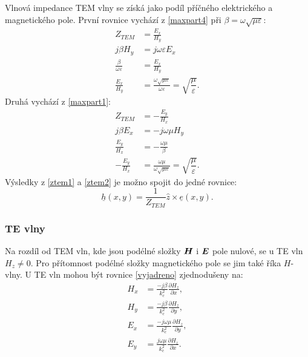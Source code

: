 \documentclass[12pt,a4paper,oneside]{article}
\numberwithin{equation}{section} %
\numberwithin{figure}{section} %
\numberwithin{table}{section} %
\renewcommand{\vec}[1]{\mbox{\boldmath$#1$}} %
\newcommand{\faz}[1]{{\underline{#1}}} %
\begin{document}
Vlnová impedance TEM vlny se získá jako podíl příčného elektrického a magnetického pole. První rovnice vychází z \ref{maxpart4} při $\beta = \omega \sqrt{\mu \varepsilon}$:
\begin{subequations}
\label{ztem1}
\begin{align}
Z_{TEM} &= \frac{E_x}{H_y}
\\
j \beta H_y &= j \omega \varepsilon E_x
\\
\frac{\beta}{\omega \varepsilon} &= \frac{E_x}{H_y}
\\
\frac{E_x}{H_y} &= \frac{\omega \sqrt{\mu \varepsilon}}{\omega \varepsilon} = \sqrt{\dfrac{\mu}{\varepsilon}} .
\end{align}
\end{subequations}
Druhá vychází z \ref{maxpart1}:
\begin{subequations}
\label{ztem2}
\begin{align}
Z_{TEM} &= - \frac{E_y}{H_x}
\\
j \beta E_x &= - j \omega \mu H_y
\\
\frac{E_y}{H_x} &= - \frac{\omega \mu}{\beta}
\\
- \frac{E_y}{H_x} &= \frac{\omega \mu}{\omega \sqrt{\mu \varepsilon}} = \sqrt{\dfrac{\mu}{\varepsilon}} .
\end{align}
\end{subequations}
Výsledky z \ref{ztem1} a \ref{ztem2} je možno spojit do jedné rovnice:
\begin{equation}
\faz{h} (x, y) = \frac{1}{Z_{TEM}} \hat{z} \times \faz{e} (x, y) .
\end{equation}


\subsubsection{TE vlny}
Na rozdíl od TEM vln, kde jsou podélné složky $\vec{H}$ i $\vec{E}$ pole nulové, se u TE vln $H_z  \neq 0$. Pro přítomnost podélné složky magnetického pole se jim také říka $H$-vlny. U TE vln mohou být rovnice \ref{vyjadreno} zjednodušeny na:
\begin{subequations}
\begin{align}
H_x &= \frac{-j \beta}{k^2_c} \frac{\partial H_z}{\partial x} ,
\\
H_y &= \frac{-j \beta}{k^2_c} \frac{\partial H_z}{\partial y} ,
\\
E_x &= \frac{-j \omega \mu}{k^2_c} \frac{\partial H_z}{\partial y} ,
\\
E_y &= \frac{j \omega \mu}{k^2_c} \frac{\partial H_z}{\partial x} .
\end{align}
\end{subequations}
\end{document}
